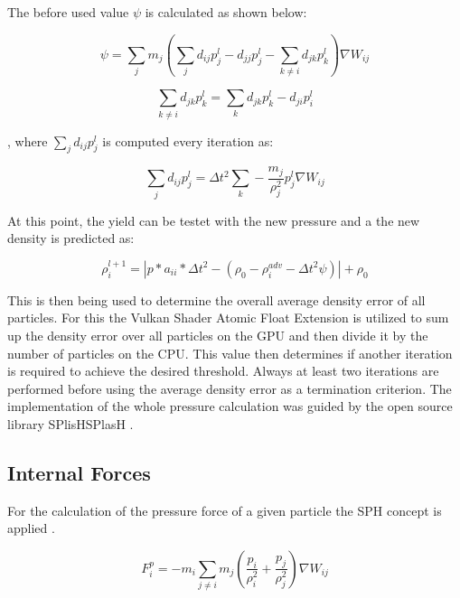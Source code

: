 \documentclass[intern]{cgMA}
\begin{document}
    The before used value $\psi$ is calculated as shown below:

    \begin{equation}
        \psi = \sum_j m_j (\sum_j d_{ij}p_j^l - d_{jj}p_j^l - \sum_{k \neq i} d_{jk}p_k^l) \nabla W_{ij}
    \end{equation}

    \begin{equation}
        \sum_{k \neq i} d_{jk}p_k^l = \sum_{k} d_{jk}p_k^l - d_{ji}p_i^l 
    \end{equation}

    , where $\sum_j d_{ij}p_j^l$ is computed every iteration as:

    \begin{equation}
        \sum_j d_{ij}p_j^l = \Delta t^2 \sum_{k} -\frac{m_j}{\rho_j^2} p_j^l \nabla W_{ij}
    \end{equation}

    At this point, the yield can be testet with the new pressure and a the new density is predicted as:

    \begin{equation}
        \rho_i^{l+1} = |p * a_{ii} * \Delta t^2 - (\rho_0 - \rho_i^{adv} - \Delta t^2 \psi)| + \rho_0
    \end{equation}

    This is then being used to determine the overall average density error of all particles. For this the Vulkan Shader Atomic Float Extension is utilized to sum up the density error over all particles on the GPU and then divide it by the number of particles on the CPU. This value then determines if another iteration is required to achieve the desired threshold. Always at least two iterations are performed before using the average density error as a termination criterion. The implementation of the whole pressure calculation was guided by the open source library SPlisHSPlasH \cite{splishsplash}.

    \subsection{Internal Forces}
    
    For the calculation of the pressure force of a given particle the SPH concept is applied \cite{10.2312:PE:vriphys:vriphys12:053-060}. 

    \begin{equation}
        F_i^p = -m_i \sum_{j \neq i} m_j (\frac{p_i}{\rho_i^2} + \frac{p_j}{\rho_j^2})  \nabla W_{ij}
    \end{equation}
    
\end{document}
